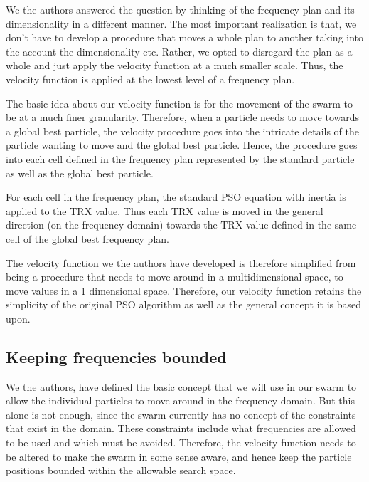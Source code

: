 We the authors answered the question by thinking of the frequency plan and its dimensionality in a different manner. The most important realization is that, we don't have to develop a procedure that moves a whole plan to another taking into the account
the dimensionality etc. Rather, we opted to disregard the plan as a whole and just apply the velocity function at a much smaller scale. Thus, the velocity function is applied at the lowest level of a frequency plan.

The basic idea about our velocity function is for the movement of the swarm to be at a much finer granularity. Therefore, when a particle needs to move towards a global best particle, the velocity procedure goes into the intricate details of the particle wanting to move and the global best particle. Hence, the procedure goes into each cell defined in the frequency plan represented by the standard particle as well as the global best particle.

For each cell in the frequency plan, the standard PSO equation with inertia is applied to the TRX value. Thus each TRX value is moved in the general direction (on the frequency domain) towards the TRX value defined in the same cell of the global best frequency plan.

The velocity function we the authors have developed is therefore simplified from being a procedure that needs to move around in a multidimensional space, to move values in a 1 dimensional space. Therefore, our velocity function retains the simplicity of the original PSO algorithm as well as the general concept it is based upon.

\subsection{Keeping frequencies bounded}
We the authors, have defined the basic concept that we will use in our swarm to allow the individual particles to move around in the frequency domain. But this alone is not enough, since the swarm currently has no concept of the constraints that exist in the domain. These constraints include what frequencies are
allowed to be used and which must be avoided. Therefore, the velocity function needs to be altered to make the swarm in some sense aware, and hence keep the particle positions bounded within the allowable search space. 

